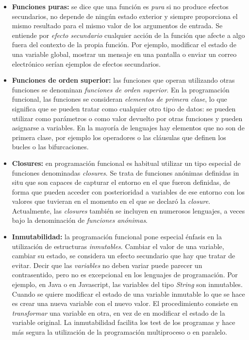 \begin{itemize}
   \item \textbf{Funciones puras:} se dice que una función es \textit{pura} si no produce efectos secundarios, no depende de ningún estado exterior y siempre proporciona el mismo resultado para el mismo valor de los argumentos de entrada. Se entiende por \textit{efecto secundario} cualquier acción de la función que afecte a algo fuera del contexto de la propia función. Por ejemplo, modificar el estado de una variable global, mostrar un mensaje en una pantalla o enviar un correo electrónico serían ejemplos de efectos secundarios.
   
   \vspace{1em}
   
   \item \textbf{Funciones de orden superior:} las funciones que operan utilizando otras funciones se denominan \textit{funciones de orden superior}. En la programación funcional, las funciones se consideran \textit{elementos de primera clase}, lo que significa que se pueden tratar como cualquier otro tipo de datos: se pueden utilizar como parámetros o como valor devuelto por otras funciones y pueden asignarse a variables. En la mayoría de lenguajes hay elementos que no son de primera clase, por ejemplo los operadores o las cláusulas que definen los bucles o las bifurcaciones.
   
   \vspace{0.5em}

   \item \textbf{Closures:} en programación funcional es habitual utilizar un tipo especial de funciones denominadas \textit{closures}. Se trata de funciones anónimas definidas in situ que son capaces de capturar el entorno en el que fueron definidas, de forma que pueden acceder con posterioridad a variables de ese entorno con los valores que tuvieran en el momento en el que se declaró la \textit{closure}. Actualmente, las \textit{closures} también se incluyen en numerosos lenguajes, a veces bajo la denominación de \textit{funciones anónimas}.
   
   \vspace{0.5em}

   \item \textbf{Inmutabilidad:} la programación funcional pone especial énfasis en la utilización de estructuras \textit{inmutables}. Cambiar el valor de una variable, cambiar su estado, se considera un efecto secundario que hay que tratar de evitar. Decir que las \textit{variables} no deben variar puede parecer un contrasentido, pero no es excepcional en los lenguajes de programación. Por ejemplo, en Java o en Javascript, las variables del tipo \textit{String} son inmutables. Cuando se quiere modificar el estado de una variable inmutable lo que se hace es crear una nueva variable con el nuevo valor. El procedimiento consiste en \textit{transformar} una variable en otra, en vez de en modificar el estado de la variable original. La inmutabilidad facilita los test de los programas y hace más segura la utilización de la programación multiproceso o en paralelo.
   

\end{itemize}
